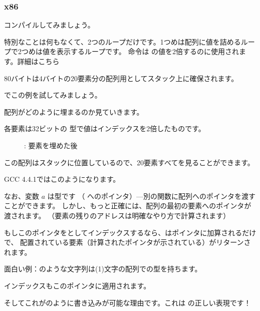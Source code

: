 ﻿\subsubsection{x86}


コンパイルしてみましょう。




特別なことは何もなくて、2つのループだけです。1つめは配列に値を詰めるループで2つめは値を表示するループです。
命令は \ECX の値を2倍するのに使用されます。詳細はこちら~

80バイトは4バイトの20要素分の配列用としてスタック上に確保されます。

\clearpage
\olly でこの例を試してみましょう。
\myindex{\olly}

配列がどのように埋まるのか見ていきます。

各要素は32ビットの \Tint 型で値はインデックスを2倍したものです。

\begin{figure}[H]
\centering
{}
\caption{\olly: 要素を埋めた後}
\label{fig:array_simple_olly}
\end{figure}

この配列はスタックに位置しているので、20要素すべてを見ることができます。


GCC 4.4.1ではこのようになります。



なお、変数 $a$ は型です
（\Tint{} へのポインタ）---別の関数に配列へのポインタを渡すことができます。
しかし、もっと正確には、配列の最初の要素へのポインタが渡されます。
（要素の残りのアドレスは明確なやり方で計算されます）

もしこのポインタをとしてインデックスするなら、はポインタに加算されるだけで、
配置されている要素（計算されたポインタが示されている）がリターンされます。

面白い例：のような文字列は(1)文字の配列での型を持ちます。

インデックスもこのポインタに適用されます。

そしてこれがのように書き込みが可能な理由です。これは \CCpp の正しい表現です！

